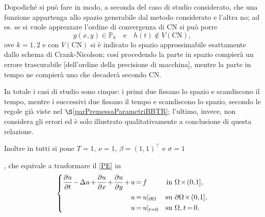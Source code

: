\documentclass{article}
\newcommand{\derP}[2]{\frac{\partial#1}{\partial#2}}
\newcommand{\SpaziaturaMate}[3]{
    \setlength{\thinmuskip}{#1mu}
    \setlength{\medmuskip}{#2mu}
    \setlength{\thickmuskip}{#3mu}
}
\newcommand{\teqref}[2]{\hyperref[#1]{#2}}
\begin{document}
                Dopodiché si può fare in modo, a seconda del caso di studio considerato, che una funzione appartenga allo spazio generabile dal metodo considerato e l'altra no; ad es. se si vuole apprezzare l'ordine di convergenza di CN si può porre
                \begin{equation*}
                    g(x,y)\in\mathbb P_k\quad
                    \text{e}\quad
                    h(t)\notin V(\text{CN}),
                \end{equation*}
                ove $k=1,2$ e con $V(\text{CN})$ si è indicato lo spazio approssimabile esattamente dallo schema di Crank-Nicolson; cosí procedendo la parte in spazio compierà un errore trascurabile [dell'ordine della precisione di macchina], mentre la parte in tempo ne compierà uno che decaderà secondo CN.
    
                In totale i casi di studio sono cinque: i primi due fissano lo spazio e scandiscono il tempo, mentre i successivi due fissano il tempo e scandiscono lo spazio, secondo le regole già viste nel $\S$\ref{parPremessaParametriBBTR}; l'ultimo, invece, non considera gli errori ed è solo illustrato qualitativamente a conclusione di questa relazione.
                
                {\SpaziaturaMate{1}{2}{3}
                Inoltre in tutti si pone $T=1$, $\nu=1$, $\beta=(1,1)^\top$ e $\sigma=1$}, che equivale a trasformare il \teqref{eqProblemaEllitticoEvolutivo}{[PE]} in
                \begin{equation}
                    \SpaziaturaMate{1}{2}{3}
                    \left\{
                    \begin{aligned}
                        \derP ut-\Delta u+\derP ux+\derP uy+u&=f&\text{in }&\Omega\times(0,1], \\
                                u&=u\vert_{\partial\Omega}&\text{su }&\partial\Omega\times(0,1],\\
                        u&=u\vert_{t=0} &\text{su }&\Omega,\;t=0.
                    \end{aligned}
                    \right.
                    \label{eqPETS12}
                \end{equation}
\end{document}
